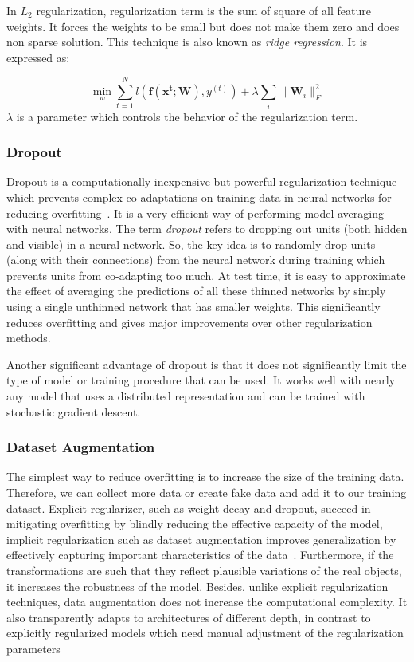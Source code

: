 In $L_{2}$ regularization, regularization term is the sum of square of all feature weights. It forces the weights to be small but does not make them zero and does non sparse solution. This technique is also known as \textit{ridge regression}. It is expressed as: 

\begin{equation}
	\min_{w} {\sum_{t=1}^{N}l(\mathbf{f(x^{t}; W)}, y^{(t)}) + \lambda\sum_{i}\parallel{\mathbf{W}_{i}}\parallel_{F}^{2}}
\end{equation}
$\lambda$ is a parameter which controls the behavior of the regularization term. 


\subsubsection{Dropout}
Dropout is a computationally inexpensive but powerful regularization technique which prevents complex co-adaptations on training data in neural networks for reducing overfitting~\cite{Srivastava_14}. It is a very efficient way of performing model averaging with neural networks. The term \textit{dropout} refers to dropping out units (both hidden and visible) in a neural network. So, the key idea is to randomly drop units (along with their connections) from the neural network during training which prevents units from co-adapting too much. At test time, it is easy to approximate the effect of averaging the predictions of all these thinned networks by simply using a single unthinned network that has smaller weights. This significantly reduces overfitting and gives major improvements over other regularization methods. 


Another significant advantage of dropout is that it does not significantly limit the type of model or training procedure that can be used. It works well with nearly any model that uses a distributed representation and can be trained with stochastic gradient descent.


\subsubsection{Dataset Augmentation}
The simplest way to reduce overfitting is to increase the size of the training data. Therefore, we can collect more data or create fake data and add it to our training dataset. Explicit regularizer, such as weight decay and dropout, succeed in mitigating overfitting by blindly reducing the effective capacity of the model, implicit regularization such as dataset augmentation improves generalization by effectively capturing important characteristics of the data~\cite{Alex_18}. Furthermore, if the transformations are such that they reflect plausible variations of the real objects, it increases the robustness of the model. Besides, unlike explicit regularization techniques, data augmentation does not increase the computational complexity. It also transparently adapts to architectures of different depth, in contrast to  explicitly regularized models which need manual adjustment of the regularization parameters


